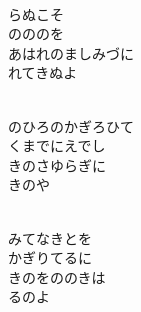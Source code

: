 \documentclass[10pt,b5j]{tarticle} %
\begin{document}
\vspace{1.5em} %
\newcommand{\linespace}{0.5em} %
\newcommand{\blocksize}{0.5\hsize} %
\newcommand{\itemmargin}{3em} %
\begin{enumerate} %
    \setlength{\itemindent}{\itemmargin} %
    \begin{minipage}[c]{\blocksize}
    
        \vspace{\linespace}
        \item~\\
        らぬこそ\\
        のののを\\
        あはれのましみづに\\
        れてきぬよ
        
        \vspace{\linespace}
        \item~\\
        のひろのかぎろひて\\
        くまでにえでし\\
        きのさゆらぎに\\
        きのや
        
        \vspace{\linespace}
        \item~\\
        みてなきとを\\
        かぎりてるに\\
        きのをののきは\\
        るのよ
        
    \end{minipage}
    \begin{minipage}[c]{\blocksize}
        

\end{minipage}
\end{enumerate}
\end{document}
